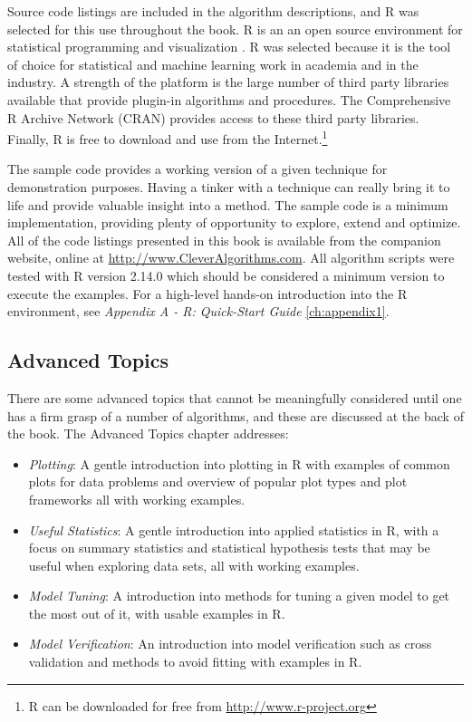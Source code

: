 Source code listings are included in the algorithm descriptions, and R was selected for this use throughout the book. R is an an open source environment for statistical programming and visualization \cite{RDevelopmentCoreTeam2011}. R was selected because it is the tool of choice for statistical and machine learning work in academia and in the industry. A strength of the platform is the large number of third party libraries available that provide plugin-in algorithms and procedures. The Comprehensive R Archive Network (CRAN) provides access to these third party libraries. Finally, R is free to download and use from the Internet.\footnote{R can be downloaded for free from \url{http://www.r-project.org}}

The sample code provides a working version of a given technique for demonstration purposes. Having a tinker with a technique can really bring it to life and provide valuable insight into a method. The sample code is a minimum implementation, providing plenty of opportunity to explore, extend and optimize.
All of the code listings presented in this book is available from the companion website, online at \url{http://www.CleverAlgorithms.com}. All algorithm scripts were tested with R version 2.14.0 which should be considered a minimum version to execute the examples. For a high-level hands-on introduction into the R environment, see \emph{Appendix A - R: Quick-Start Guide} \ref{ch:appendix1}.

\subsection{Advanced Topics}
There are some advanced topics that cannot be meaningfully considered until one has a firm grasp of a number of algorithms, and these are discussed at the back of the book. 
The Advanced Topics chapter addresses:

\begin{itemize}
	\item \emph{Plotting}: A gentle introduction into plotting in R with examples of common plots for data problems and overview of popular plot types and plot frameworks all with working examples.
	\item \emph{Useful Statistics}: A gentle introduction into applied statistics in R, with a focus on summary statistics and statistical hypothesis tests that may be useful when exploring data sets, all with working examples.
	\item \emph{Model Tuning}: A introduction into methods for tuning a given model to get the most out of it, with usable examples in R.
	\item \emph{Model Verification}: An introduction into model verification such as cross validation and methods to avoid fitting with examples in R.
\end{itemize}

